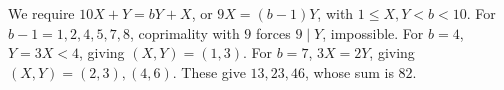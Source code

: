 We require $10X+Y=bY+X$, or $9X=(b-1)Y$, with $1\le X,Y<b<10$. For $b-1=1,2,4,5,7,8$, coprimality with $9$ forces $9\mid Y$, impossible. For $b=4$, $Y=3X<4$, giving $(X,Y)=(1,3)$. For $b=7$, $3X=2Y$, giving $(X,Y)=(2,3),(4,6)$. These give $13,23,46$, whose sum is $\boxed{82}$.
